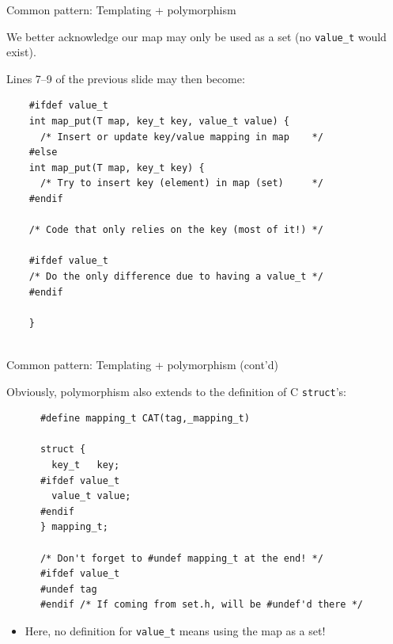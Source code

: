 \begin{frame}[fragile]{Common pattern: Templating + polymorphism}

  We better acknowledge our map may only be used as a set (no \lstinline{value_t} would exist).

  Lines 7--9 of the previous slide may then become:

  \begin{lstlisting}
    #ifdef value_t
    int map_put(T map, key_t key, value_t value) {
      /* Insert or update key/value mapping in map    */
    #else
    int map_put(T map, key_t key) {
      /* Try to insert key (element) in map (set)     */
    #endif

    /* Code that only relies on the key (most of it!) */

    #ifdef value_t
    /* Do the only difference due to having a value_t */
    #endif

    }
    
  \end{lstlisting}
  
\end{frame}

\begin{frame}[fragile]{Common pattern: Templating + polymorphism (cont'd)}

  Obviously, polymorphism also extends to the definition of C \lstinline{struct}'s:

    \begin{lstlisting}
      #define mapping_t CAT(tag,_mapping_t)

      struct {
        key_t   key;
      #ifdef value_t
        value_t value;
      #endif
      } mapping_t;
      
      /* Don't forget to #undef mapping_t at the end! */
      #ifdef value_t
      #undef tag
      #endif /* If coming from set.h, will be #undef'd there */
  \end{lstlisting}

  \begin{itemize}
  \item Here, no definition for \lstinline{value_t} means using the map as a set!
  \end{itemize}

\end{frame}

